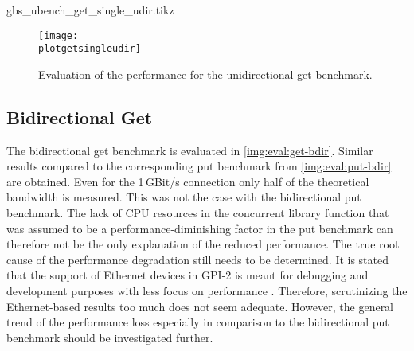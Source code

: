 \newcommand{\plotgetsingleudir}{gbs_ubench_get_single_udir.tikz}
\begin{filecontents}{\plotgetsingleudir}
\newcommand{\csv}{gbs_ubench_get_single_udir.csv}
\newcommand{\csvgi}{result-gi/\csv}
\newcommand{\csvte}{result-te/\csv}
\newcommand{\csvipoib}{result-ipoib/\csv}
\newcommand{\csvib}{result-ib/\csv}

\end{filecontents}

\begin{figure}[htb]
\centering
\texttt{[image: \\plotgetsingleudir]}
\caption{Evaluation of the performance for the unidirectional get benchmark.}
\label{img:eval:get-udir}
\end{figure}

\subsection{Bidirectional Get}

The bidirectional get benchmark is evaluated in \autoref{img:eval:get-bdir}. Similar results compared to the corresponding put benchmark from \autoref{img:eval:put-bdir} are obtained. Even for the 1\,GBit/s connection only half of the theoretical bandwidth is measured. This was not the case with the bidirectional put benchmark.  The lack of \ac{CPU} resources in the concurrent library function that was assumed to be a performance-diminishing factor in the put benchmark can therefore not be the only explanation of the reduced performance. The true root cause of the performance degradation still needs to be determined. It is stated that the support of Ethernet devices in \ac{GPI}-2 is meant for debugging and development purposes with less focus on performance \cite{gpi-2-github}. Therefore, scrutinizing the Ethernet-based results too much does not seem adequate. However, the general trend of the performance loss especially in comparison to the bidirectional put benchmark should be investigated further.


